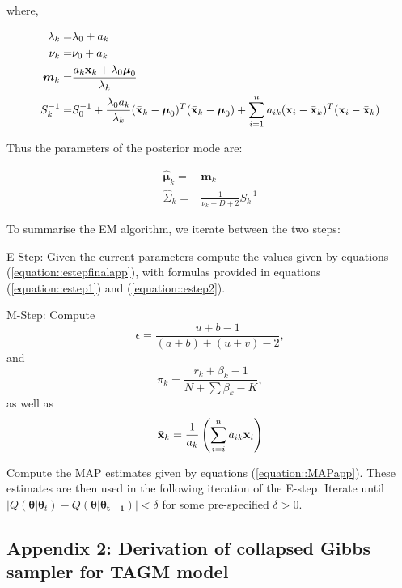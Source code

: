 \documentclass[12pt,english]{article}\usepackage[]{graphicx}\usepackage[]{color}
\begin{document}
where,

\begin{equation}\label{equation::Posterior}
\begin{split}
\lambda_k = &\lambda_0 + a_k \\
\nu_k = & \nu_0 + a_k \\
\boldsymbol{m}_k = & \frac{a_k\bar{{\bf x}}_k + \lambda_0\boldsymbol{\mu}_0}{\lambda_k}\\
S_k^{-1}  = & S_0^{-1} + \frac{\lambda_0 a_k}{\lambda_k}(\bar{{\bf x}}_k - \boldsymbol{\mu}_0)^{T} (\bar{{\bf x}}_k - \boldsymbol{\mu}_0) + \sum_{i=1}^{n} a_{ik}({\bf x}_i -\bar{{\bf x}}_k)^{T}({\bf x}_i -\bar{{\bf x}}_k)
\end{split}
\end{equation}

Thus the parameters of the posterior mode are:

\begin{equation}\label{equation::MAPapp}
\begin{split}
\boldsymbol{\hat{\mu}}_k = &\boldsymbol{m}_k \\
\hat{\Sigma}_k = & \frac{1}{\nu_k + D + 2}S_k^{-1}
\end{split}
\end{equation}

To summarise the EM algorithm, we iterate between the two steps:

\bigskip

E-Step: Given the current parameters compute the values given by
equations (\ref{equation::estepfinalapp}), with formulas provided in
equations (\ref{equation::estep1}) and (\ref{equation::estep2}).

\bigskip

M-Step:
Compute
\[\epsilon = \frac{ u + b - 1}{(a+b) + (u+v) - 2},\]
and
\[\pi_k = \frac{r_k + \beta_k - 1}{N + \sum \beta_k - K},\]
as well as
\[\bar{{\bf x}}_k = \frac{1}{a_k}\left(\sum_{i=i}^{n}a_{ik}{\bf x}_i\right)\]

Compute the MAP estimates given by equations
(\ref{equation::MAPapp}). These estimates are then used in the
following iteration of the E-step. Iterate until
$\lvert Q(\boldsymbol{\theta}|\boldsymbol{\theta}_{t}) -
Q(\boldsymbol{\theta}|\boldsymbol{\theta_{t-1}})\rvert < \delta$ for
some pre-specified $\delta >0$.

\subsection{Appendix 2: Derivation of collapsed Gibbs sampler for TAGM model}\label{app::gibbs}
\end{document}
